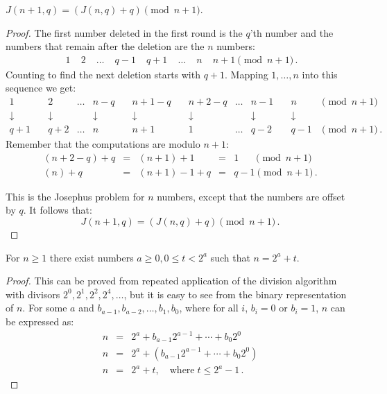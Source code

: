 \begin{theorem}\label{thm.jo1}
$J(n+1,q)=(J(n,q)+q) \pmod {n+1}$.
\end{theorem}

\begin{proof}
The first number deleted in the first round is the $q$'th number and the numbers that remain after the deletion are the $n$ numbers:
\[
\begin{array}{rrrrrrrr}
\;1&\;2&\;\ldots&\;q-1&\;q+1&\;\ldots&\;n&\;n+1 \pmod {n+1}\,.
\end{array}
\]
Counting to find the next deletion starts with $q+1$. Mapping $1,\ldots,n$ into this sequence we get:
\[
\begin{array}{cccccccccc}
1&\quad 2&\ldots& n-q&\quad n+1-q&\quad n+2-q&\ldots&n-1&\quad n& \!\!\!\!\!\!\pmod {n\!+\!1}\\
\downarrow&\quad \downarrow&&\downarrow&\quad \downarrow&\quad \downarrow&&\downarrow&\quad \downarrow\\
q+1&\quad q+2&\ldots&n&\quad n+1&\quad 1&\ldots&q-2&\quad q-1& \!\!\!\pmod {n\!+\!1}\,.
\end{array}
\]
Remember that the computations are modulo $n+1$:
\[
\begin{array}{lclcl}
(n+2-q)+q&=& (n+1)+1&=& 1 \quad\;\;\pmod {n+1}\\
(n)+q&= &(n+1)-1+q&= &q-1\pmod {n+1}\,.
\end{array}
\]

This is the Josephus problem for $n$ numbers, except that the numbers are offset by $q$. It follows that:
\[
J(n+1,q)=(J(n,q)+q) \pmod {n+1}\,.
\]
\end{proof}

\begin{theorem}\label{lem.jo}
For $n\geq 1$ there exist numbers $a\geq 0, 0\leq t < 2^a$ such that $n=2^a+t$.
\end{theorem}
\begin{proof}
This can be proved from repeated application of the division algorithm with divisors $2^0, 2^1, 2^2, 2^4,\ldots$, but it is easy to see from the binary representation of $n$. For some $a$ and $b_{a-1},b_{a-2},\ldots,b_{1},b_{0}$, where for all $i$, $b_i=0$ or $b_i=1$, $n$ can be expressed as:
\begin{eqnarray*}
n&=&2^a+b_{a-1}2^{a-1}+\cdots+b_{0}2^{0}\\
n&=&2^a+(b_{a-1}2^{a-1}+\cdots+b_{0}2^{0})\\
n&=&2^a+t,\quad \textrm{where}\; t\leq 2^a-1\,.
\end{eqnarray*}
\end{proof}


